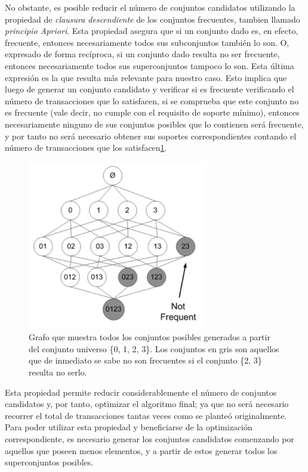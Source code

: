 No obstante, es posible reducir el número de conjuntos candidatos utilizando la propiedad de \textit{clausura descendiente} de los conjuntos frecuentes, tambien llamado \textit{principio Apriori}. Esta propiedad asegura que si un conjunto dado es, en efecto, frecuente, entonces necesariamente todos sus subconjuntos también lo son. O, expresado de forma recíproca, si un conjunto dado resulta no ser frecuente, entonces necesariamente todos sus superconjuntos tampoco lo son. Esta última expresión es la que resulta más relevante para nuestro caso. Esto implica que luego de generar un conjunto candidato y verificar si es frecuente verificando el número de transacciones que lo satisfacen, si se comprueba que este conjunto no es frecuente (vale decir, no cumple con el requisito de soporte mínimo), entonces necesariamente ninguno de sus conjuntos posibles que lo contienen será frecuente, y por tanto no será necesario obtener sus soportes correspondientes contando el número de transacciones que los satisfacen\ref{fig:unfrequent_itemsets}.

\begin{figure}[h!]
\begin{center}
\includegraphics[width=0.7\textwidth]{imagenes/unfrequent_itemsets.png}
\end{center}
\vspace*{-5mm}
\caption{Grafo que muestra todos los conjuntos posibles generados a partir del conjunto universo \{0, 1, 2, 3\}. Los conjuntos en gris son aquellos que de inmediato se sabe no son frecuentes si el conjunto \{2, 3\} resulta no serlo\cite{harrington2012machine}.}
\label{fig:unfrequent_itemsets}
\end{figure}

Esta propiedad permite reducir considerablemente el número de conjuntos candidatos y, por tanto, optimizar el algoritmo final; ya que no será necesario recorrer el total de transacciones tantas veces como se planteó originalmente. Para poder utilizar esta propiedad y beneficiarse de la optimización correspondiente, es necesario generar los conjuntos candidatos comenzando por aquellos que poseen menos elementos, y a partir de estos generar todos los superconjuntos posibles.

